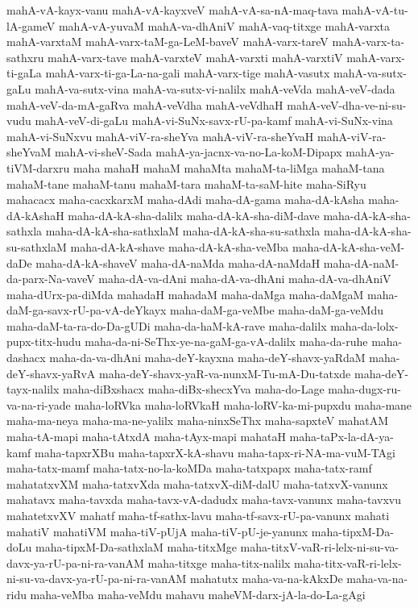 {mahA-vA-kayx-vanu
mahA-vA-kayxveV
mahA-vA-sa-nA-maq-tava
mahA-vA-tu-lA-gameV
mahA-vA-yuvaM
mahA-va-dhAniV
mahA-vaq-titxge
mahA-varxta
mahA-varxtaM
mahA-varx-taM-ga-LeM-baveV
mahA-varx-tareV
mahA-varx-ta-sathxru
mahA-varx-tave
mahA-varxteV
mahA-varxti
mahA-varxtiV
mahA-varx-ti-gaLa
mahA-varx-ti-ga-La-na-gali
mahA-varx-tige
mahA-vasutx
mahA-va-sutx-gaLu
mahA-va-sutx-vina
mahA-va-sutx-vi-nalilx
mahA-veVda
mahA-veV-dada
mahA-veV-da-mA-gaRva
mahA-veVdha
mahA-veVdhaH
mahA-veV-dha-ve-ni-su-vudu
mahA-veV-di-gaLu
mahA-vi-SuNx-savx-rU-pa-kamf
mahA-vi-SuNx-vina
mahA-vi-SuNxvu
mahA-viV-ra-sheYva
mahA-viV-ra-sheYvaH
mahA-viV-ra-sheYvaM
mahA-vi-sheV-Sada
mahA-ya-jacnx-va-no-La-koM-Dipapx
mahA-ya-tiVM-darxru
maha
mahaH
mahaM
mahaMta
mahaM-ta-liMga
mahaM-tana
mahaM-tane
mahaM-tanu
mahaM-tara
mahaM-ta-saM-hite
maha-SiRyu
mahacacx
maha-cacxkarxM
maha-dAdi
maha-dA-gama
maha-dA-kAsha
maha-dA-kAshaH
maha-dA-kA-sha-dalilx
maha-dA-kA-sha-diM-dave
maha-dA-kA-sha-sathxla
maha-dA-kA-sha-sathxlaM
maha-dA-kA-sha-su-sathxla
maha-dA-kA-sha-su-sathxlaM
maha-dA-kA-shave
maha-dA-kA-sha-veMba
maha-dA-kA-sha-veM-daDe
maha-dA-kA-shaveV
maha-dA-naMda
maha-dA-naMdaH
maha-dA-naM-da-parx-Na-vaveV
maha-dA-va-dAni
maha-dA-va-dhAni
maha-dA-va-dhAniV
maha-dUrx-pa-diMda
mahadaH
mahadaM
maha-daMga
maha-daMgaM
maha-daM-ga-savx-rU-pa-vA-deYkayx
maha-daM-ga-veMbe
maha-daM-ga-veMdu
maha-daM-ta-ra-do-Da-gUDi
maha-da-haM-kA-rave
maha-dalilx
maha-da-lolx-pupx-titx-hudu
maha-da-ni-SeThx-ye-na-gaM-ga-vA-dalilx
maha-da-ruhe
maha-dashacx
maha-da-va-dhAni
maha-deY-kayxna
maha-deY-shavx-yaRdaM
maha-deY-shavx-yaRvA
maha-deY-shavx-yaR-va-nunxM-Tu-mA-Du-tatxde
maha-deY-tayx-nalilx
maha-diBxshacx
maha-diBx-shecxYva
maha-do-Lage
maha-dugx-ru-va-na-ri-yade
maha-loRVka
maha-loRVkaH
maha-loRV-ka-mi-pupxdu
maha-mane
maha-ma-neya
maha-ma-ne-yalilx
maha-ninxSeThx
maha-sapxteV
mahatAM
maha-tA-mapi
maha-tAtxdA
maha-tAyx-mapi
mahataH
maha-taPx-la-dA-ya-kamf
maha-tapxrXBu
maha-tapxrX-kA-shavu
maha-tapx-ri-NA-ma-vuM-TAgi
maha-tatx-mamf
maha-tatx-no-la-koMDa
maha-tatxpapx
maha-tatx-ramf
mahatatxvXM
maha-tatxvXda
maha-tatxvX-diM-dalU
maha-tatxvX-vanunx
mahatavx
maha-tavxda
maha-tavx-vA-dadudx
maha-tavx-vanunx
maha-tavxvu
mahatetxvXV
mahatf
maha-tf-sathx-lavu
maha-tf-savx-rU-pa-vanunx
mahati
mahatiV
mahatiVM
maha-tiV-pUjA
maha-tiV-pU-je-yanunx
maha-tipxM-Da-doLu
maha-tipxM-Da-sathxlaM
maha-titxMge
maha-titxV-vaR-ri-lelx-ni-su-va-davx-ya-rU-pa-ni-ra-vanAM
maha-titxge
maha-titx-nalilx
maha-titx-vaR-ri-lelx-ni-su-va-davx-ya-rU-pa-ni-ra-vanAM
mahatutx
maha-va-na-kAkxDe
maha-va-na-ridu
maha-veMba
maha-veMdu
mahavu
maheVM-darx-jA-la-do-La-gAgi
}
